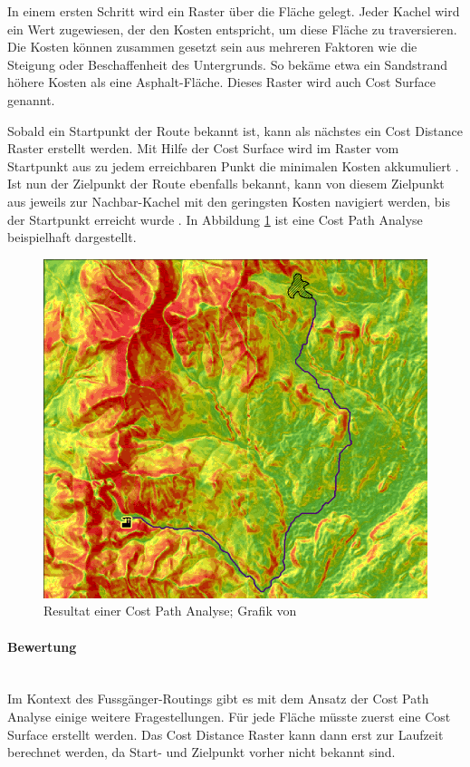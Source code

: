 In einem ersten Schritt wird ein Raster über die Fläche gelegt. Jeder Kachel wird ein Wert zugewiesen, der den Kosten entspricht, um diese Fläche zu traversieren. Die Kosten können zusammen gesetzt sein aus mehreren Faktoren wie die Steigung oder Beschaffenheit des Untergrunds. So bekäme etwa ein Sandstrand höhere Kosten als eine Asphalt-Fläche. Dieses Raster wird auch Cost Surface genannt. \cite{gid_fundamentals}

Sobald ein Startpunkt der Route bekannt ist, kann als nächstes ein Cost Distance Raster erstellt werden. Mit Hilfe der Cost Surface wird im Raster vom Startpunkt aus zu jedem erreichbaren Punkt die minimalen Kosten akkumuliert \cite{geospatial_analysis}. Ist nun der Zielpunkt der Route ebenfalls bekannt, kann von diesem Zielpunkt aus jeweils zur Nachbar-Kachel mit den geringsten Kosten navigiert werden, bis der Startpunkt erreicht wurde \cite{cost_path_analysis}. In Abbildung \ref{fig:cost_path_analysis} ist eine Cost Path Analyse beispielhaft dargestellt.


\begin{figure}[ht]
    \centering
    \includegraphics[width=0.6\linewidth]{technicalreport/img/cost_path_analysis}
    \caption[Cost Path Analyse]{Resultat einer Cost Path Analyse; Grafik von \cite{geospatial_analysis}}
    \label{fig:cost_path_analysis}
\end{figure}

\paragraph{Bewertung}~\\
Im Kontext des Fussgänger-Routings gibt es mit dem Ansatz der Cost Path Analyse einige weitere Fragestellungen. Für jede Fläche müsste zuerst eine Cost Surface erstellt werden. Das Cost Distance Raster kann dann erst zur Laufzeit berechnet werden, da Start- und Zielpunkt vorher nicht bekannt sind.

